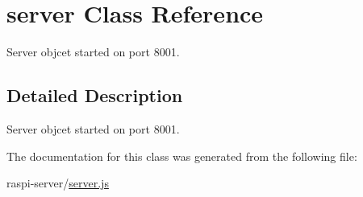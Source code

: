 \hypertarget{classserver}{\section{server Class Reference}
\label{classserver}
}


Server objcet started on port 8001.  




\subsection{Detailed Description}
Server objcet started on port 8001. 

The documentation for this class was generated from the following file\+:\begin{DoxyCompactItemize}
\item 
raspi-\/server/\hyperlink{server_8js}{server.\+js}\end{DoxyCompactItemize}
